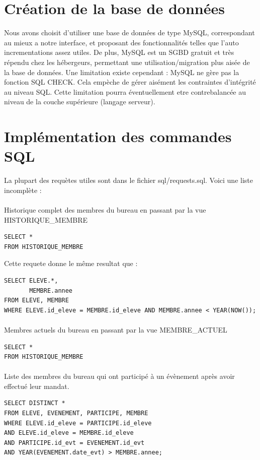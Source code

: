 \documentclass[a4paper, 11pt]{article}
\begin{document}
\section{Création de la base de données}
Nous avons choisit d'utiliser une base de données de type MySQL, correspondant au mieux a notre interface, et proposant des fonctionnalités telles que l'auto incrementations assez utiles. De plus, MySQL est un SGBD gratuit et très répendu chez les hébergeurs, permettant une utilisation/migration plus aisée de la base de données. Une limitation existe cependant : MySQL ne gère pas la fonction SQL CHECK. Cela empèche de gérer aisément les contraintes d'intégrité au niveau SQL. Cette limitation pourra éventuellement etre contrebalancée au niveau de la couche supérieure (langage serveur).

\section{Implémentation des commandes SQL}
La plupart des requètes utiles sont dans le fichier sql/requests.sql. Voici une liste incomplète :
\paragraph{}
Historique complet des membres du bureau en passant par la vue HISTORIQUE\_MEMBRE
\begin{verbatim}
SELECT *
FROM HISTORIQUE_MEMBRE
\end{verbatim}
Cette requete donne le même resultat que :
\begin{verbatim}
SELECT ELEVE.*,
       MEMBRE.annee
FROM ELEVE, MEMBRE 
WHERE ELEVE.id_eleve = MEMBRE.id_eleve AND MEMBRE.annee < YEAR(NOW());
\end{verbatim}
\paragraph{}
Membres actuels du bureau en passant par la vue MEMBRE\_ACTUEL
\begin{verbatim}
SELECT *
FROM HISTORIQUE_MEMBRE
\end{verbatim}
\paragraph{}
Liste des membres du bureau qui ont participé à un évènement après avoir effectué leur mandat.
\begin{verbatim}
SELECT DISTINCT *
FROM ELEVE, EVENEMENT, PARTICIPE, MEMBRE
WHERE ELEVE.id_eleve = PARTICIPE.id_eleve
AND ELEVE.id_eleve = MEMBRE.id_eleve
AND PARTICIPE.id_evt = EVENEMENT.id_evt
AND YEAR(EVENEMENT.date_evt) > MEMBRE.annee;
\end{verbatim}
\end{document}
